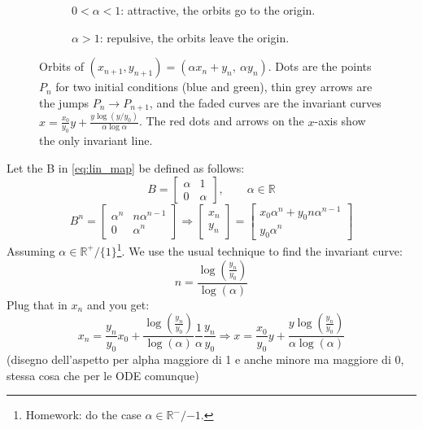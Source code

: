 \begin{example}
    \begin{figure}[ht]
        \centering
        \begin{subfigure}[t]{0.48\textwidth}
            \centering
            \caption{$0<\alpha<1$: attractive, the orbits go to the origin.}
        \end{subfigure}\hfill
        \begin{subfigure}[t]{0.48\textwidth}
            \centering
            \caption{$\alpha>1$: repulsive, the orbits leave the origin.}
        \end{subfigure}

        \caption{Orbits of $(x_{n+1},y_{n+1})=(\alpha x_n+y_n,\ \alpha y_n)$. Dots are the points
        $P_n$ for two initial conditions (blue and green), thin grey arrows are the jumps
        $P_n\to P_{n+1}$, and the faded curves are the invariant curves
        $x=\frac{x_0}{y_0}y+\frac{y\log(y/y_0)}{\alpha\log\alpha}$.
        The red dots and arrows on the $x$-axis show the only invariant line.}
        \label{fig:jordan_maps}
    \end{figure}
    Let the B in \autoref{eq:lin_map} be defined as follows:
    \begin{equation*}
        B=\begin{bmatrix}
            \alpha & 1 \\ 0 & \alpha
        \end{bmatrix}, \qquad\alpha\in\mathbb{R}
    \end{equation*}
    \begin{equation*}
        B^n=\begin{bmatrix}
            \alpha^n & n\alpha^{n-1} \\ 0 & \alpha^n
        \end{bmatrix}\Rightarrow\begin{bmatrix}
            x_n \\ y_n
        \end{bmatrix}=\begin{bmatrix}
            x_0\alpha^n+y_0n\alpha^{n-1} \\ y_0\alpha^n
        \end{bmatrix}
    \end{equation*}
    Assuming $\alpha\in\mathbb{R}^+/\{1\}$\footnote{Homework: do the case $\alpha\in\mathbb{R}^-/{-1}$.}. We use the usual technique to find the invariant curve: \begin{equation*}
        n=\frac{\log\left(\frac{y_n}{y_0}\right)}{\log(\alpha)}
    \end{equation*}
    Plug that in $x_n$ and you get:
    \begin{equation*}
        x_n=\frac{y_n}{y_0}x_0+\frac{\log\left(\frac{y_n}{y_0}\right)}{\log(\alpha)}\frac{1}{\alpha}\frac{y_n}{y_0}\Rightarrow x=\frac{x_0}{y_0}y+\frac{y\log\left(\frac{y_n}{y_0}\right)}{\alpha \log(\alpha)}
    \end{equation*}
    (disegno dell'aspetto per alpha maggiore di 1 e anche minore ma maggiore di 0, stessa cosa che per le ODE comunque) 


\end{example}
